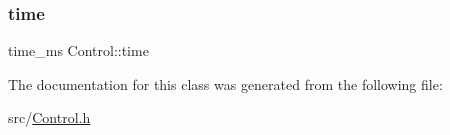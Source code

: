 \mbox{\label{struct_control_a273f3488d567bb10871e71245a406f3e}} 
\subsubsection{\texorpdfstring{time}{time}}
{\footnotesize\ttfamily time\+\_\+ms Control\+::time}



The documentation for this class was generated from the following file\+:\begin{DoxyCompactItemize}
\item 
src/\hyperlink{_control_8h}{Control.\+h}\end{DoxyCompactItemize}
